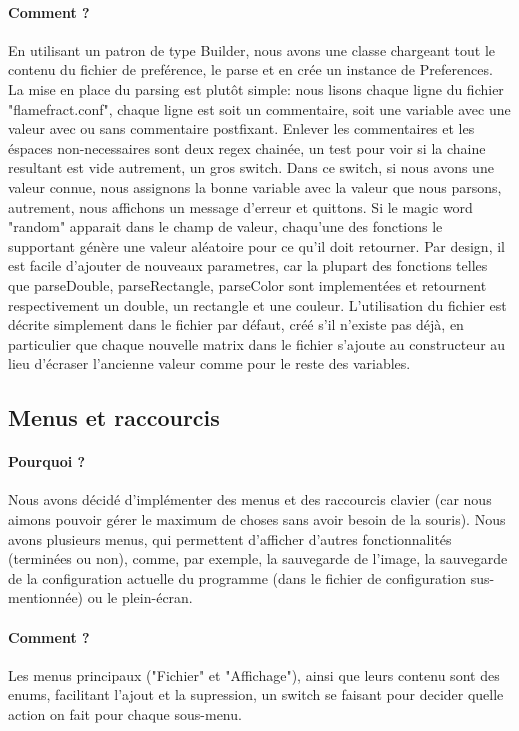 \documentclass[a4paper]{article}
\begin{document}
\paragraph{Comment ?}
En utilisant un patron de type Builder, nous avons une classe chargeant tout le contenu du fichier de preférence, le parse et en crée un instance de Preferences. La mise en place du parsing est plutôt simple: nous lisons chaque ligne du fichier "flamefract.conf", chaque ligne est soit un commentaire, soit une variable avec une valeur avec ou sans commentaire postfixant. Enlever les commentaires et les éspaces non-necessaires sont deux regex chainée, un test pour voir si la chaine resultant est vide autrement, un gros switch. Dans ce switch, si nous avons une valeur connue, nous assignons la bonne variable avec la valeur que nous parsons, autrement, nous affichons un message d'erreur et quittons. Si le magic word "random" apparait dans le champ de valeur, chaqu'une des fonctions le supportant génère une valeur aléatoire pour ce qu'il doit retourner. Par design, il est facile d'ajouter de nouveaux parametres, car la plupart des fonctions telles que parseDouble, parseRectangle, parseColor sont implementées et retournent respectivement un double, un rectangle et une couleur. L'utilisation du fichier est décrite simplement dans le fichier par défaut, créé s'il n'existe pas déjà, en particulier que chaque nouvelle matrix dans le fichier s'ajoute au constructeur au lieu d'écraser l'ancienne valeur comme pour le reste des variables.

\subsection*{Menus et raccourcis}
\paragraph{Pourquoi ?}
Nous avons décidé d'implémenter des menus et des raccourcis clavier (car nous aimons pouvoir gérer le maximum de choses sans avoir besoin de la souris). Nous avons plusieurs menus, qui permettent d'afficher d'autres fonctionnalités (terminées ou non), comme, par exemple, la sauvegarde de l'image, la sauvegarde de la configuration actuelle du programme (dans le fichier de configuration sus-mentionnée) ou le plein-écran.

\paragraph{Comment ?}
Les menus principaux ("Fichier" et "Affichage"), ainsi que leurs contenu sont des enums, facilitant l'ajout et la supression, un switch se faisant pour decider quelle action on fait pour chaque sous-menu.
\end{document}
